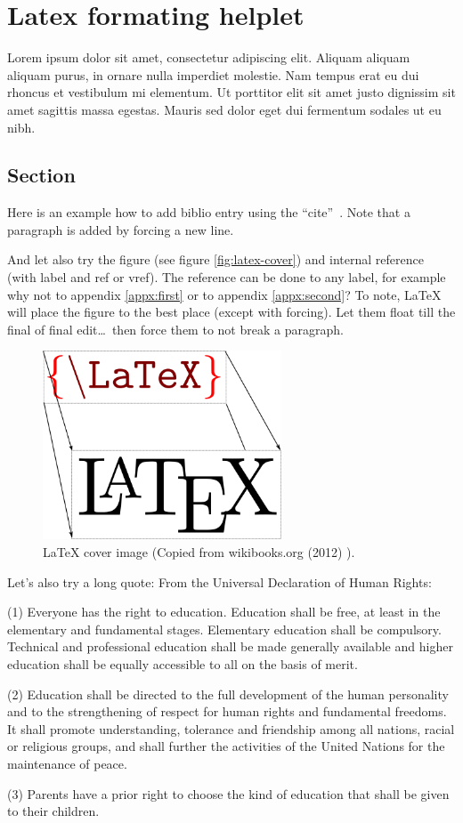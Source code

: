 \documentclass[11pt,a4paper,oneside,article]{memoir}
\renewenvironment{quote}
  {\list{}{\rightmargin=0pt\leftmargin=1cm\topsep=-10pt}%
  \item\relax\fontsize{10pt}{10pt}\singlespacing}
  {\endlist}
\begin{document}
\chapter{Latex formating helplet}
Lorem ipsum dolor sit amet, consectetur adipiscing elit. Aliquam aliquam aliquam purus, in ornare nulla imperdiet molestie. Nam tempus erat eu dui rhoncus et vestibulum mi elementum. Ut porttitor elit sit amet justo dignissim sit amet sagittis massa egestas. Mauris sed dolor eget dui fermentum sodales ut eu nibh. 

\section{Section}
Here is an example how to add biblio entry \cite{kopka:guide} using the \textquotedblleft cite\textquotedblright ~\cite[section 4.2]{tobias:book}. Note that a paragraph is added by forcing a new line.

And let also try the figure (see figure \vref{fig:latex-cover}) and internal reference (with label and ref or vref). The reference can be done to any label, for example why not to appendix \ref{appx:first} or to appendix \ref{appx:second}? To note, \LaTeX{} will place the figure to the best place (except with forcing). Let them float till the final of final edit\ldots ~then force them to not break a paragraph.%
\begin{figure}[h]
  \centering
  \includegraphics[width=7.1cm]{LaTeX_cover}
  \caption{\LaTeX{} cover image (Copied from wikibooks.org (2012) \cite{wikibooks:latex}).}
  \label{fig:latex-cover}
\end{figure}

Let's also try a long quote:
From the Universal Declaration of Human Rights:
\begin{quote}
(1) Everyone has the right to education. Education shall be free, at least in the elementary and fundamental stages. Elementary education shall be compulsory. Technical and professional education shall be made generally available and higher education shall be equally accessible to all on the basis of merit.

(2) Education shall be directed to the full development of the human personality and to the strengthening of respect for human rights and fundamental freedoms. It shall promote understanding, tolerance and friendship among all nations, racial or religious groups, and shall further the activities of the United Nations for the maintenance of peace.

(3) Parents have a prior right to choose the kind of education that shall be given to their children. \cite[article 26]{un:udhr}
\end{quote}
\end{document}
